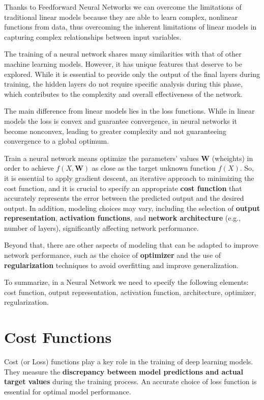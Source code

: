 Thanks to Feedforward Neural Networks we can overcome the limitations of traditional linear models because they are able to learn complex, nonlinear functions from data, thus overcoming the inherent limitations of linear models in capturing complex relationships between input variables.

The training of a neural network shares many similarities with that of other machine learning models. However, it has unique features that deserve to be explored. While it is essential to provide only the output of the final layers during training, the hidden layers do not require specific analysis during this phase, which contributes to the complexity and overall effectiveness of the network.

The main difference from linear models lies in the loss functions. While in linear models the loss is convex and guarantee convergence, in neural networks it become nonconvex, leading to greater complexity and not guaranteeing convergence to a global optimum.

Train a neural network means optimize the parameters' values $\mathbf{W}$ (wheights) in order to achieve $f(X,\mathbf{W})$ as close as the target unknown function $f(X)$. So, it is essential to apply gradient descent, an iterative approach to minimizing the cost function, and it is crucial to specify an appropriate \textbf{cost function} that accurately represents the error between the predicted output and the desired output. In addition, modeling choices may vary, including the selection of \textbf{output representation}, \textbf{activation functions}, and \textbf{network architecture} (e.g., number of layers), significantly affecting network performance.

Beyond that, there are other aspects of modeling that can be adapted to improve network performance, such as the choice of \textbf{optimizer} and the use of \textbf{regularization} techniques to avoid overfitting and improve generalization. 

To summarize, in a Neural Network we need to specify the following elements: cost function, output representation, activation function, architecture, optimizer, regularization.

\section{Cost Functions}

Cost (or Loss) functions play a key role in the training of deep learning models. They measure the \textbf{discrepancy between model predictions and actual target values} during the training process. An accurate choice of loss function is essential for optimal model performance.

